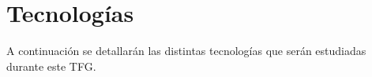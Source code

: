 \section{Tecnologías}
A continuación se detallarán las distintas tecnologías que serán estudiadas durante este TFG.